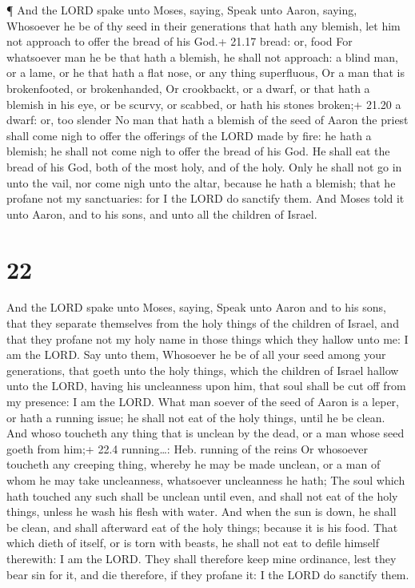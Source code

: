  ¶ And the LORD spake unto Moses, saying, 
Speak unto Aaron, saying, Whosoever he be of thy seed in their
generations that hath any blemish, let him not approach to offer the
bread of his God.+ 21.17 bread: or, food  For whatsoever
man he be that hath a blemish, he shall not approach: a blind man, or a
lame, or he that hath a flat nose, or any thing superfluous,
 Or a man that is brokenfooted, or brokenhanded,
 Or crookbackt, or a dwarf, or that hath a blemish in his
eye, or be scurvy, or scabbed, or hath his stones broken;+ 21.20 a
dwarf: or, too slender  No man that hath a blemish of the
seed of Aaron the priest shall come nigh to offer the offerings of the
LORD made by fire: he hath a blemish; he shall not come nigh to offer
the bread of his God.  He shall eat the bread of his God,
both of the most holy, and of the holy.  Only he shall not
go in unto the vail, nor come nigh unto the altar, because he hath a
blemish; that he profane not my sanctuaries: for I the LORD do sanctify
them.  And Moses told it unto Aaron, and to his sons, and
unto all the children of Israel.

\hypertarget{section-21}{%
\section{22}\label{section-21}}

 And the LORD spake unto Moses, saying,  Speak
unto Aaron and to his sons, that they separate themselves from the holy
things of the children of Israel, and that they profane not my holy name
in those things which they hallow unto me: I am the LORD. 
Say unto them, Whosoever he be of all your seed among your generations,
that goeth unto the holy things, which the children of Israel hallow
unto the LORD, having his uncleanness upon him, that soul shall be cut
off from my presence: I am the LORD.  What man soever of the
seed of Aaron is a leper, or hath a running issue; he shall not eat of
the holy things, until he be clean. And whoso toucheth any thing that is
unclean by the dead, or a man whose seed goeth from him;+ 22.4
running\ldots: Heb. running of the reins  Or whosoever
toucheth any creeping thing, whereby he may be made unclean, or a man of
whom he may take uncleanness, whatsoever uncleanness he hath;
 The soul which hath touched any such shall be unclean until
even, and shall not eat of the holy things, unless he wash his flesh
with water.  And when the sun is down, he shall be clean,
and shall afterward eat of the holy things; because it is his food.
 That which dieth of itself, or is torn with beasts, he
shall not eat to defile himself therewith: I am the LORD. 
They shall therefore keep mine ordinance, lest they bear sin for it, and
die therefore, if they profane it: I the LORD do sanctify them.


